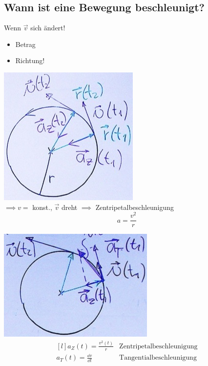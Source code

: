 \subsection{Wann ist eine Bewegung beschleunigt?}
Wenn $\vec{v}$ sich ändert!
\begin{itemize}[label = $\rightarrow$]
	\item Betrag
	\item Richtung!
\end{itemize}
\begin{bsp*}[note = Kreisbewegung mit konstante Umlaufgeschwindigkeit]
	\includegraphics{Bild16}\\
	$\implies v =$ konst., $\vec{v}$ dreht $\implies$ Zentripetalbeschleunigung
	\[ a = \frac{v^2}{r} \]
\end{bsp*}
\begin{bsp*}[note = beliebige Kreisbewegung ($v \neq$ konst.)]
	\includegraphics{Bild17} \\
	\[ \begin{matrix*}[l]
		a_Z(t) = \frac{v^2(t)}{r}		&\text{Zentripetalbeschleunigung} \\
		a_T(t) = \frac{\dd v}{\dd t}	&\text{Tangentialbeschleunigung}
	\end{matrix*} \]
\end{bsp*}

